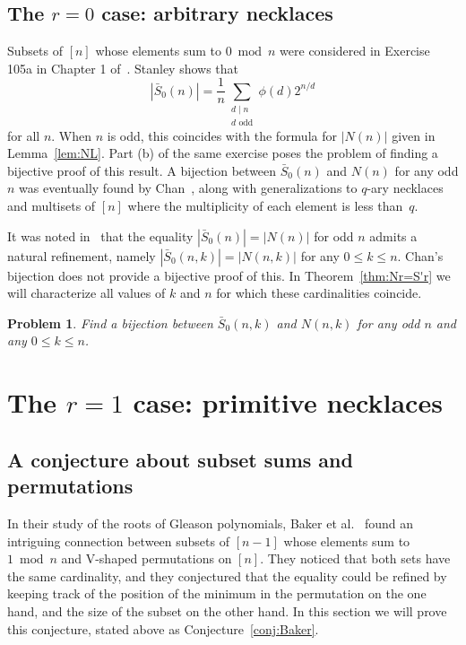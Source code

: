 \documentclass[12pt]{article}
\newcommand{\card}[1]{\left|#1\right|}
\newcommand{\bS}{\bar{S}}
\newtheorem{problem}[theorem]{Problem}
\theoremstyle{definition}
\begin{document}
\subsection{The $r=0$ case: arbitrary necklaces}
\label{sec:r=0}

Subsets of $[n]$ whose elements sum to $0\bmod n$ were considered in Exercise 105a in Chapter 1 of~\cite{EC1}. Stanley shows that
\begin{equation}    \label{eq:S0'}
    \card{\bS_0(n)}=\frac{1}{n} \sum_{\substack{d \mid n \\ d \text{ odd}}} \phi(d) 2^{n / d}
\end{equation}
for all $n$.
When $n$ is odd, this coincides with the formula for $\card{N(n)}$ given in
Lemma~\ref{lem:NL}. Part (b) of the same exercise poses the problem of finding a
bijective proof of this result. A bijection between $\bS_0(n)$ and $N(n)$ for any
odd $n$ was eventually found by Chan~\cite{Chan}, along with generalizations to
$q$-ary necklaces and multisets of $[n]$ where the multiplicity of each element
is less than~$q$.

It was noted in~\cite{Chan} that the equality $\card{\bS_0(n)}=\card{N(n)}$ for odd $n$
admits a natural refinement, namely $\card{\bS_0(n,k)}=\card{N(n,k)}$ for any $0\le k\le
n$. Chan's bijection does not provide a bijective proof of this. In Theorem~\ref{thm:Nr=S'r} we will
characterize all values of $k$ and $n$ for which these cardinalities coincide.

\begin{problem}\label{prob:Chan}
    Find a bijection between $\bS_0(n,k)$ and $N(n,k)$ for any odd $n$ and any $0\le k\le n$. 
\end{problem}

\section{The $r=1$ case: primitive necklaces}
\label{sec:r=1}

\subsection{A conjecture about subset sums and permutations}

In their study of the roots of Gleason polynomials, Baker et al.~\cite{Baker} found an intriguing connection between subsets of $[n-1]$ whose elements sum to $1\bmod n$ and V-shaped permutations on $[n]$. They noticed that both sets have the same cardinality, and they conjectured that the equality could be refined by keeping track of the position of the minimum in the permutation on the one hand, and the size of the subset on the other hand. In this section we will prove this conjecture, stated above as Conjecture~\ref{conj:Baker}.
\end{document}
